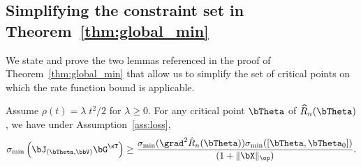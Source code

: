 \subsection{Simplifying the constraint set in Theorem~\ref{thm:global_min}}
\label{sec:simplifying_constraint_set}
We state and prove the two lemmas referenced in the proof of Theorem~\ref{thm:global_min} that allow us to simplify the set of critical points on which the rate function bound is applicable. 
\begin{lemma}
\label{lemma:jacobian_lb}
Assume $\rho(t) = \lambda \; t^2/2$ for $\lambda \ge0$.
For any critical point $\bTheta$ of $\widehat R_n(\bTheta)$, 
we have under Assumption~\ref{ass:loss},
\begin{equation}
    \sigma_{\min}\left( \bJ_{(\bTheta,\bbV)} \bG^\sT\right) \ge 
     \frac{\sigma_{\min}(\grad^2 \hat R_n(\bTheta))
     \sigma_{\min}([\bTheta,\bTheta_0])
     }{(1 + \|\bX\|_\op )}.
\end{equation}
\end{lemma}

